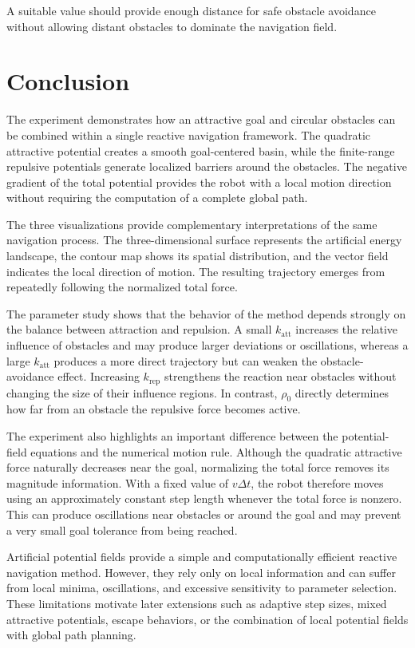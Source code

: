 \documentclass[10pt,twocolumn,a4paper]{article}
\begin{document}
A suitable value should provide enough distance for safe obstacle
avoidance without allowing distant obstacles to dominate the navigation
field.

\section{Conclusion}

The experiment demonstrates how an attractive goal and circular obstacles
can be combined within a single reactive navigation framework. The
quadratic attractive potential creates a smooth goal-centered basin, while
the finite-range repulsive potentials generate localized barriers around
the obstacles. The negative gradient of the total potential provides the
robot with a local motion direction without requiring the computation of a
complete global path.

The three visualizations provide complementary interpretations of the same
navigation process. The three-dimensional surface represents the artificial
energy landscape, the contour map shows its spatial distribution, and the
vector field indicates the local direction of motion. The resulting
trajectory emerges from repeatedly following the normalized total force.

The parameter study shows that the behavior of the method depends strongly
on the balance between attraction and repulsion. A small
$k_{\mathrm{att}}$ increases the relative influence of obstacles and may
produce larger deviations or oscillations, whereas a large
$k_{\mathrm{att}}$ produces a more direct trajectory but can weaken the
obstacle-avoidance effect. Increasing $k_{\mathrm{rep}}$ strengthens the
reaction near obstacles without changing the size of their influence
regions. In contrast, $\rho_0$ directly determines how far from an obstacle
the repulsive force becomes active.

The experiment also highlights an important difference between the
potential-field equations and the numerical motion rule. Although the
quadratic attractive force naturally decreases near the goal, normalizing
the total force removes its magnitude information. With a fixed value of
$v\Delta t$, the robot therefore moves using an approximately constant step
length whenever the total force is nonzero. This can produce oscillations
near obstacles or around the goal and may prevent a very small goal
tolerance from being reached.

Artificial potential fields provide a simple and computationally efficient
reactive navigation method. However, they rely only on local information
and can suffer from local minima, oscillations, and excessive sensitivity
to parameter selection. These limitations motivate later extensions such
as adaptive step sizes, mixed attractive potentials, escape behaviors, or
the combination of local potential fields with global path planning.
\end{document}
